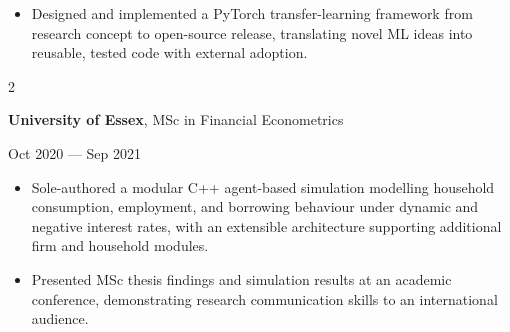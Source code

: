 \documentclass[6pt, letterpaper]{article}
\newenvironment{highlights}{
    \begin{itemize}[
        topsep=0.03 cm,
        parsep=0.03 cm,
        partopsep=0pt,
        itemsep=0pt,
        leftmargin=0 cm + 10pt
    ]
}{
    \end{itemize}
} %
\newenvironment{twocolentry}[2][]{
    \onecolentry
    \def\secondColumn{#2}
    \setcolumnwidth{\fill, 4.5 cm}
    \begin{paracol}{2}
}{
    \switchcolumn \raggedleft \secondColumn
    \end{paracol}
    \endonecolentry
} %
\begin{document}
            \begin{highlights}

            \item Designed and implemented a PyTorch transfer-learning framework from research concept to open-source release, translating novel ML ideas into reusable, tested code with external adoption.

            \end{highlights}

            \begin{twocolentry}{
                Oct 2020 --- Sep 2021
            }
            \textbf{University of Essex}, MSc in Financial Econometrics
            \end{twocolentry}

            \begin{highlights}

            \item Sole-authored a modular C++ agent-based simulation modelling household consumption, employment, and borrowing behaviour under dynamic and negative interest rates, with an extensible architecture supporting additional firm and household modules.
            \item Presented MSc thesis findings and simulation results at an academic conference, demonstrating research communication skills to an international audience.

            \end{highlights}
\end{document}
